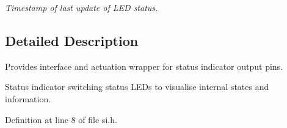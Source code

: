 \begin{DoxyCompactItemize}
\begin{DoxyCompactList}\small\item\em Timestamp of last update of L\+ED status. \end{DoxyCompactList}\end{DoxyCompactItemize}


\subsection{Detailed Description}
Provides interface and actuation wrapper for status indicator output pins. 

Status indicator switching status L\+E\+Ds to visualise internal states and information. 

Definition at line 8 of file si.\+h.

